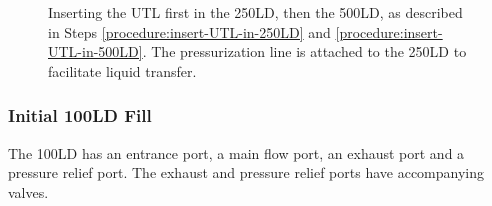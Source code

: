 \begin{figure}[htbp!]
\begin{minipage}{.58\textwidth}
 \end{minipage}
 \caption{Inserting the UTL first in the 250LD, then the 500LD, as described in Steps \ref{procedure:insert-UTL-in-250LD} and \ref{procedure:insert-UTL-in-500LD}.  The pressurization line is attached to the 250LD to facilitate liquid transfer.}
 \label{fig:500LDfill-03-04-insert-UTL-in-250LD-and-500LD}
 \end{figure}
 


\subsubsection{Initial 100LD Fill}

The 100LD has an entrance port, a main flow port, an exhaust port and a pressure relief port.  The exhaust and pressure relief ports have accompanying valves.
 
